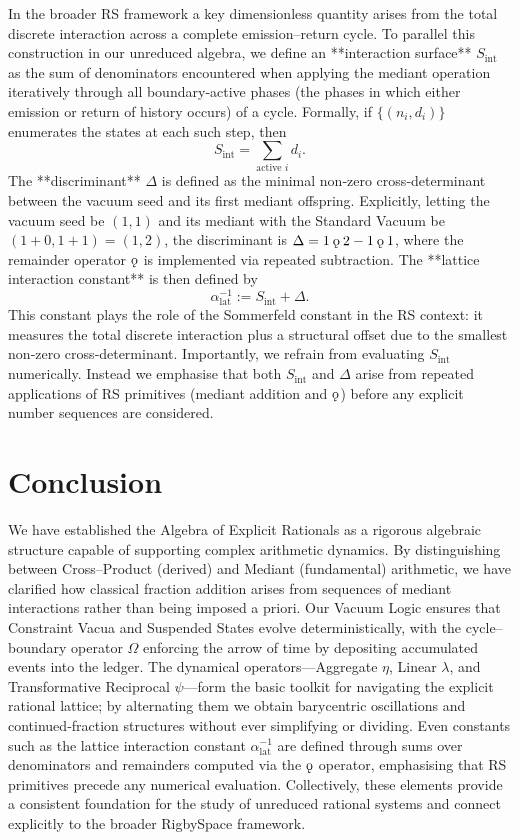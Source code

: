 \documentclass[11pt, letterpaper]{article}
\newcommand{\psiOp}{\psi}
\newcommand{\etaOp}{\eta}
\newcommand{\lambdaOp}{\lambda}
\newcommand{\OmegaOp}{\Omega}
\newcommand{\koppa}{\mathbin{\text{\rm\k{o}}}}
\newcommand{\alphaRS}{\alpha^{-1}_{\mathrm{lat}}}
\begin{document}
In the broader RS framework a key dimensionless quantity arises from the total
discrete interaction across a complete emission–return cycle.  To parallel
this construction in our unreduced algebra, we define an **interaction
surface** \(S_{\mathrm{int}}\) as the sum of denominators encountered when
applying the mediant operation iteratively through all boundary‑active phases
(the phases in which either emission or return of history occurs) of a
cycle.  Formally, if \(\{(n_i,d_i)\}\) enumerates the states at each such
step, then
\[
    S_{\mathrm{int}} = \sum_{\text{active } i} d_i.
\]
The **discriminant** \(\Delta\) is defined as the minimal non‑zero
cross‑determinant between the vacuum seed and its first mediant offspring.
Explicitly, letting the vacuum seed be \((1,1)\) and its mediant with the
Standard Vacuum be \((1+0,1+1)=(1,2)\), the discriminant is
\(\Delta = 1\mathbin{\koppa}2 - 1\mathbin{\koppa}1\), where the remainder
operator \(\koppa\) is implemented via repeated subtraction.  The **lattice
interaction constant** is then defined by
\[
    \alphaRS := S_{\mathrm{int}} + \Delta.
\]
This constant plays the role of the Sommerfeld constant in the RS context: it
measures the total discrete interaction plus a structural offset due to the
smallest non‑zero cross‑determinant.  Importantly, we refrain from
evaluating \(S_{\mathrm{int}}\) numerically.  Instead we emphasise that both
\(S_{\mathrm{int}}\) and \(\Delta\) arise from repeated applications of RS
primitives (mediant addition and $\koppa$) before any explicit number sequences
are considered.

\section{Conclusion}

We have established the Algebra of Explicit Rationals as a rigorous algebraic structure capable of supporting complex arithmetic dynamics.  By distinguishing between Cross–Product (derived) and Mediant (fundamental) arithmetic, we have clarified how classical fraction addition arises from sequences of mediant interactions rather than being imposed a priori.  Our Vacuum Logic ensures that Constraint Vacua and Suspended States evolve deterministically, with the cycle–boundary operator $\OmegaOp$ enforcing the arrow of time by depositing accumulated events into the ledger.  The dynamical operators—Aggregate $\etaOp$, Linear $\lambdaOp$, and Transformative Reciprocal $\psiOp$—form the basic toolkit for navigating the explicit rational lattice; by alternating them we obtain barycentric oscillations and continued‐fraction structures without ever simplifying or dividing.  Even constants such as the lattice interaction constant $\alphaRS$ are defined through sums over denominators and remainders computed via the $\koppa$ operator, emphasising that RS primitives precede any numerical evaluation.  Collectively, these elements provide a consistent foundation for the study of unreduced rational systems and connect explicitly to the broader RigbySpace framework.
\end{document}
